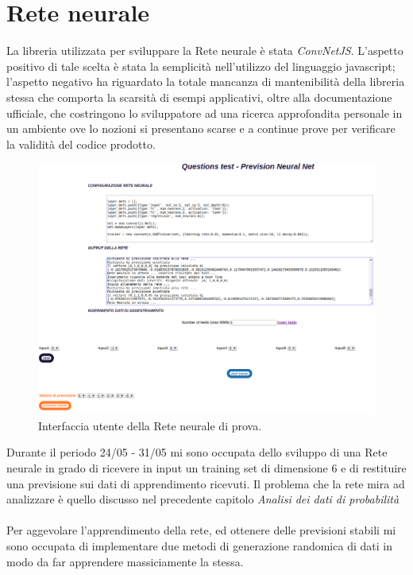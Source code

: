 \section{Rete neurale}
\label{Rete neurale}

La libreria utilizzata per sviluppare la Rete neurale \`e stata \textit{ConvNetJS}. L'aspetto positivo di tale scelta \`e stata la semplicit\`a nell'utilizzo del linguaggio javascript; l'aspetto negativo ha riguardato la totale mancanza di mantenibilit\`a della libreria stessa che comporta la scarsit\`a di esempi applicativi, oltre alla documentazione ufficiale, che costringono lo sviluppatore ad una ricerca approfondita personale in un ambiente ove lo nozioni si presentano scarse e a continue prove per verificare la validit\`a del codice prodotto.
\begin{figure}[H]
\centering
	\includegraphics[width=1\linewidth]{./image/GUI-rete-neurale.png}
	\caption{Interfaccia utente della Rete neurale di prova.}
\end{figure}
\noindent
Durante il periodo 24/05 - 31/05 mi sono occupata dello sviluppo di una Rete neurale in grado di ricevere in input un training set di dimensione 6 e di restituire una previsione sui dati di apprendimento ricevuti.
\noindent
Il problema che la rete mira ad analizzare \`e quello discusso nel precedente capitolo \textit{Analisi dei dati di probabilit\`a}
\\\\
Per aggevolare l'apprendimento della rete, ed ottenere delle previsioni stabili mi sono occupata di implementare due metodi di generazione randomica di dati in modo da far apprendere massiciamente la stessa.
